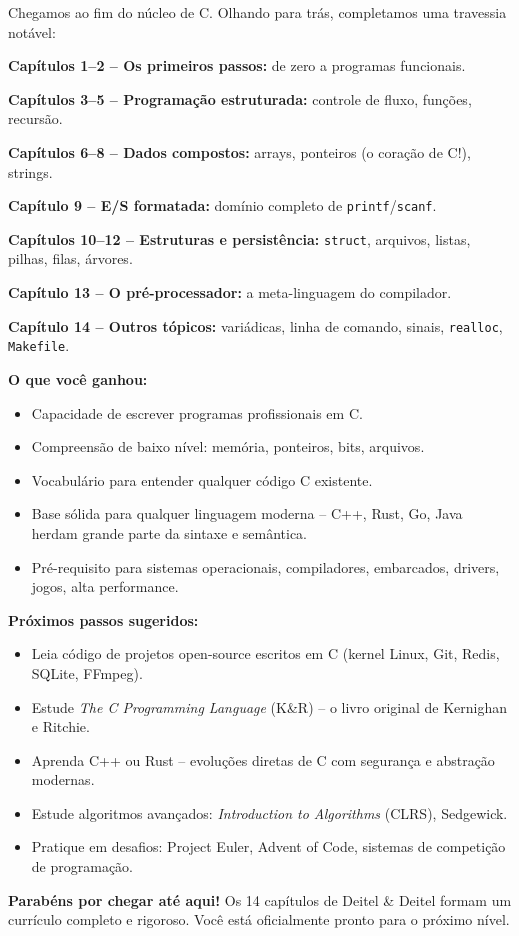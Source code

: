 \documentclass[12pt,a4paper]{article}
\begin{document}
\begin{tcolorbox}[colback=deitellightblue,colframe=deitelblue,
  title={\bfseries 14 capítulos, uma jornada completa}]

Chegamos ao fim do núcleo de C. Olhando para trás, completamos uma travessia
notável:

\textbf{Capítulos 1--2 -- Os primeiros passos:} de zero a programas funcionais.

\textbf{Capítulos 3--5 -- Programação estruturada:} controle de fluxo, funções,
recursão.

\textbf{Capítulos 6--8 -- Dados compostos:} arrays, ponteiros (o coração de C!), strings.

\textbf{Capítulo 9 -- E/S formatada:} domínio completo de \texttt{printf}/\texttt{scanf}.

\textbf{Capítulos 10--12 -- Estruturas e persistência:} \texttt{struct},
arquivos, listas, pilhas, filas, árvores.

\textbf{Capítulo 13 -- O pré-processador:} a meta-linguagem do compilador.

\textbf{Capítulo 14 -- Outros tópicos:} variádicas, linha de comando, sinais,
\texttt{realloc}, \texttt{Makefile}.

\bigskip

\textbf{O que você ganhou:}
\begin{itemize}[noitemsep]
  \item Capacidade de escrever programas profissionais em C.
  \item Compreensão de baixo nível: memória, ponteiros, bits, arquivos.
  \item Vocabulário para entender qualquer código C existente.
  \item Base sólida para qualquer linguagem moderna -- C++, Rust, Go, Java
  herdam grande parte da sintaxe e semântica.
  \item Pré-requisito para sistemas operacionais, compiladores, embarcados,
  drivers, jogos, alta performance.
\end{itemize}

\textbf{Próximos passos sugeridos:}
\begin{itemize}[noitemsep]
  \item Leia código de projetos open-source escritos em C (kernel Linux, Git,
  Redis, SQLite, FFmpeg).
  \item Estude \textit{The C Programming Language} (K\&R) -- o livro original
  de Kernighan e Ritchie.
  \item Aprenda C++ ou Rust -- evoluções diretas de C com segurança e
  abstração modernas.
  \item Estude algoritmos avançados: \textit{Introduction to Algorithms}
  (CLRS), Sedgewick.
  \item Pratique em desafios: Project Euler, Advent of Code, sistemas de
  competição de programação.
\end{itemize}

\textbf{Parabéns por chegar até aqui!} Os 14 capítulos de Deitel \& Deitel
formam um currículo completo e rigoroso. Você está oficialmente pronto para
o próximo nível.

\end{tcolorbox}
\end{document}
